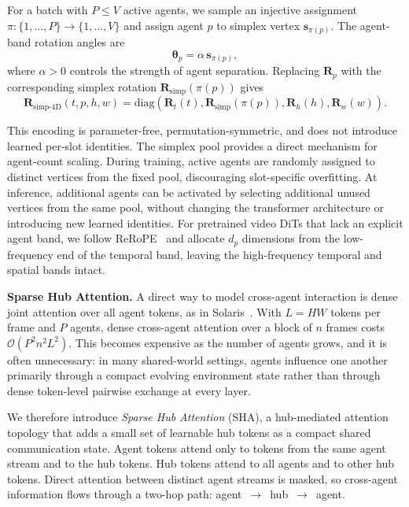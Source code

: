 \documentclass{llmxive}
\begin{document}
For a batch with $P\leq V$ active agents, we sample an injective assignment
$\pi:\{1,\ldots,P\}\rightarrow\{1,\ldots,V\}$
and assign agent $p$ to simplex vertex $\mathbf{s}_{\pi(p)}$.
The agent-band rotation angles are
\begin{equation}
\boldsymbol{\theta}_p=\alpha\,\mathbf{s}_{\pi(p)},
\end{equation}
where $\alpha>0$ controls the strength of agent separation.
Replacing $\mathbf{R}_{p}$ with the corresponding simplex rotation $\mathbf{R}_{\mathrm{simp}}(\pi(p))$ gives
\begin{equation}
\mathbf{R}_{\mathrm{simp\text{-}4D}}(t,p,h,w)
=
\mathrm{diag}\!\left(
\mathbf{R}_{t}(t),
\mathbf{R}_{\mathrm{simp}}(\pi(p)),
\mathbf{R}_{h}(h),
\mathbf{R}_{w}(w)
\right).
\end{equation}

This encoding is parameter-free, permutation-symmetric, and does not introduce learned per-slot identities.
The simplex pool provides a direct mechanism for agent-count scaling.
During training, active agents are randomly assigned to distinct vertices from the fixed pool, discouraging slot-specific overfitting.
At inference, additional agents can be activated by selecting additional unused vertices from the same pool, without changing the transformer architecture or introducing new learned identities.
For pretrained video DiTs that lack an explicit agent band, we follow ReRoPE~\cite{li2026rerope} and allocate $d_p$ dimensions from the low-frequency end of the temporal band, leaving the high-frequency temporal and spatial bands intact.



\noindent\textbf{Sparse Hub Attention.}
\label{sec:sparse-hub-attention}
A direct way to model cross-agent interaction is dense joint attention over all agent tokens, as in Solaris~\cite{savva2026solaris}.
With $L=HW$ tokens per frame and $P$ agents, dense cross-agent attention over a block of $n$ frames costs $\mathcal{O}(P^2n^2L^2)$.
This becomes expensive as the number of agents grows, and it is often unnecessary: in many shared-world settings, agents influence one another primarily through a compact evolving environment state rather than through dense token-level pairwise exchange at every layer.

We therefore introduce \emph{Sparse Hub Attention} (SHA), a hub-mediated attention topology that adds a small set of learnable hub tokens as a compact shared communication state.
Agent tokens attend only to tokens from the same agent stream and to the hub tokens.
Hub tokens attend to all agents and to other hub tokens.
Direct attention between distinct agent streams is masked, so cross-agent information flows through a two-hop path: agent~$\rightarrow$~hub~$\rightarrow$~agent.
\end{document}
